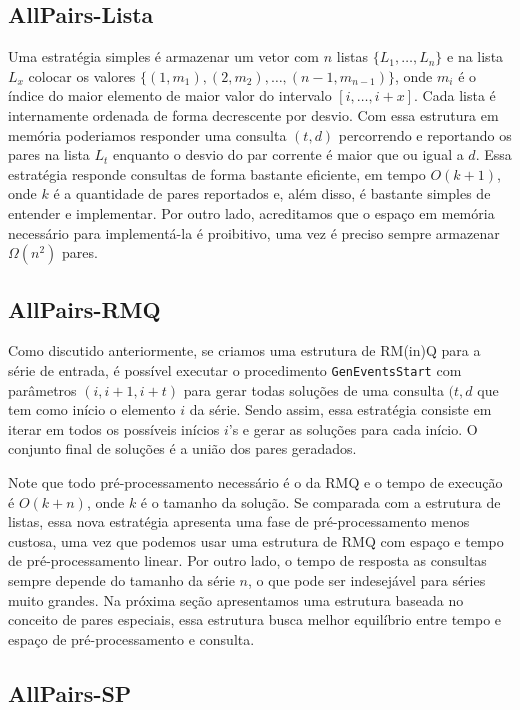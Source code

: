 \documentclass[dissertacao, brazil]{ThesisPUC}
\begin{document}
\subsection{AllPairs-Lista}

Uma estratégia simples é armazenar um vetor com $n$ listas $\{L_1, \ldots, L_n\}$ e na lista $L_x$ colocar os valores 
$\{(1, m_1), (2, m_2), \ldots, (n-1, m_{n-1})\}$, onde $m_i$ é o índice do maior elemento de maior valor do intervalo $[i, \ldots, i + x]$. 
Cada lista é internamente ordenada de forma decrescente por desvio. Com essa estrutura em memória poderiamos responder uma consulta $(t, d)$
 percorrendo e reportando os pares na lista $L_t$ enquanto o desvio do par corrente é maior que ou igual a $d$. Essa estratégia responde 
 consultas de forma bastante eficiente, em tempo $O(k + 1)$, onde $k$ é a quantidade de pares reportados e, além disso, é bastante simples
  de entender e implementar. Por outro lado, acreditamos que o espaço em memória necessário para implementá-la é proibitivo, uma vez é preciso
   sempre armazenar $\Omega(n^2)$ pares.  

\subsection{AllPairs-RMQ}

Como discutido anteriormente, se criamos uma estrutura de RM(in)Q para a série
de entrada, é possível executar o procedimento {\tt GenEventsStart} com parâmetros
$(i, i + 1, i + t)$ para gerar todas soluções de uma consulta $(t, d$ que tem como
início o elemento $i$ da série. Sendo assim, essa estratégia consiste em iterar 
em todos os possíveis inícios $i$'s e gerar as soluções para cada início. 
O conjunto final de soluções é a união dos pares geradados. 

Note que todo pré-processamento necessário é o da RMQ e o tempo de execução é $O(k + n)$, onde $k$ é o tamanho da solução.
Se comparada com a estrutura de listas, essa nova estratégia apresenta uma
fase de pré-processamento menos custosa, uma vez que podemos usar uma
estrutura de RMQ com espaço e tempo de pré-processamento linear. Por outro lado,
o tempo de resposta as consultas sempre depende do tamanho da série $n$, o que
pode ser indesejável para séries muito grandes. Na próxima seção apresentamos
uma estrutura baseada no conceito de pares especiais, essa estrutura busca
melhor equilíbrio entre tempo e espaço de pré-processamento e consulta. 

\subsection{AllPairs-SP}
\end{document}
